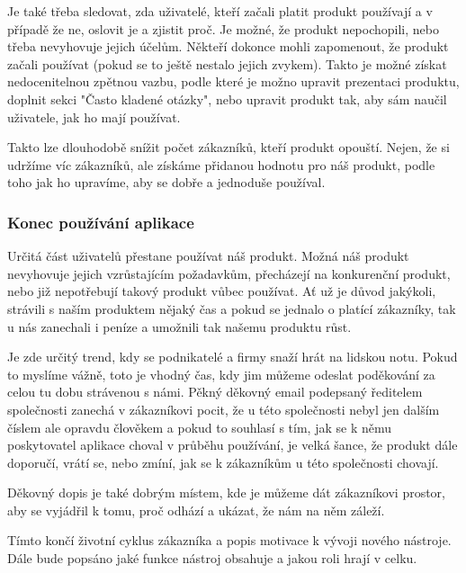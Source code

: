 \documentclass[bc,male,java,dept456]{diploma}						%
\begin{document}
Je také třeba sledovat, zda uživatelé, kteří začali platit produkt používají a v případě že ne, oslovit je a zjistit proč. Je možné, že produkt nepochopili, nebo třeba nevyhovuje jejich účelům. Někteří dokonce mohli zapomenout, že produkt začali používat (pokud se to ještě nestalo jejich zvykem). Takto je možné získat nedocenitelnou zpětnou vazbu, podle které je možno upravit prezentaci produktu, doplnit sekci "Často kladené otázky", nebo upravit produkt tak, aby sám naučil uživatele, jak ho mají používat. 

Takto lze dlouhodobě snížit počet zákazníků, kteří produkt opouští. Nejen, že si u\-dr\-ží\-me víc zákazníků, ale získáme přidanou hodnotu pro náš produkt, podle toho jak ho upravíme, aby se dobře a jednoduše používal.




\subsubsection{Konec používání aplikace}

Určitá část uživatelů přestane používat náš produkt. Možná náš produkt nevyhovuje jejich vzrůstajícím požadavkům, přecházejí na konkurenční produkt, nebo již nepotřebují takový produkt vůbec používat. Ať už je důvod jakýkoli, strávili s naším produktem nějaký čas a pokud se jednalo o platící zákazníky, tak u nás zanechali i peníze a umožnili tak našemu produktu růst.

Je zde určitý trend, kdy se podnikatelé a firmy snaží hrát na lidskou notu. Pokud to myslíme vážně, toto je vhodný čas, kdy jim můžeme odeslat poděkování za celou tu dobu strávenou s námi. Pěkný děkovný email podepsaný ředitelem společnosti zanechá v zákazníkovi pocit, že u této společnosti nebyl jen dalším číslem ale opravdu člověkem a pokud to souhlasí s tím, jak se k němu poskytovatel aplikace choval v průběhu používání, je velká šance, že produkt dále doporučí, vrátí se, nebo zmíní, jak se k zákazníkům u této společnosti chovají.

Děkovný dopis je také dobrým místem, kde je můžeme dát zákazníkovi prostor, aby se vyjádřil k tomu, proč odhází a ukázat, že nám na něm záleží.

\bigskip

Tímto končí životní cyklus zákazníka a popis motivace k vývoji nového nástroje. Dále bude popsáno jaké funkce nástroj obsahuje a jakou roli hrají v celku.
\end{document}
